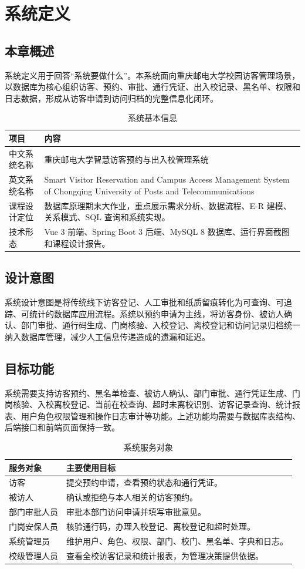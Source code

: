 \section{系统定义}
\subsection{本章概述}
系统定义用于回答“系统要做什么”。本系统面向重庆邮电大学校园访客管理场景，以数据库为核心组织访客、预约、审批、通行凭证、出入校记录、黑名单、权限和日志数据，形成从访客申请到访问归档的完整信息化闭环。
\begin{longtable}{>{\raggedright\arraybackslash}p{}>{\raggedright\arraybackslash}p{}}
\caption{系统基本信息}\\
\toprule
项目 & 内容 \\
\midrule
中文系统名称 & 重庆邮电大学智慧访客预约与出入校管理系统 \\
英文系统名称 & Smart Visitor Reservation and Campus Access Management System of Chongqing University of Posts and Telecommunications \\
课程设计定位 & 数据库原理期末大作业，重点展示需求分析、数据流程、E-R 建模、关系模式、SQL 查询和系统实现。 \\
技术形态 & Vue 3 前端、Spring Boot 3 后端、MySQL 8 数据库、运行界面截图和课程设计报告。 \\
\bottomrule
\end{longtable}
\subsection{设计意图}
系统设计意图是将传统线下访客登记、人工审批和纸质留痕转化为可查询、可追踪、可统计的数据库应用流程。系统以预约申请为主线，将访客身份、被访人确认、部门审批、通行码生成、门岗核验、入校登记、离校登记和访问记录归档统一纳入数据库管理，减少人工信息传递造成的遗漏和延迟。

\subsection{目标功能}
系统需要支持访客预约、黑名单检查、被访人确认、部门审批、通行凭证生成、门岗核验、入校离校登记、当前在校查询、超时未离校识别、访客记录查询、统计报表、用户角色权限管理和操作日志审计等功能。上述功能均需要与数据库表结构、后端接口和前端页面保持一致。
\begin{longtable}{>{\raggedright\arraybackslash}p{}>{\raggedright\arraybackslash}p{}}
\caption{系统服务对象}\\
\toprule
服务对象 & 主要使用目标 \\
\midrule
访客 & 提交预约申请，查看预约状态和通行凭证。 \\
被访人 & 确认或拒绝与本人相关的访客预约。 \\
部门审批人员 & 审批本部门访问申请并填写审批意见。 \\
门岗安保人员 & 核验通行码，办理入校登记、离校登记和超时处理。 \\
系统管理员 & 维护用户、角色、权限、部门、校门、黑名单、字典和日志。 \\
校级管理人员 & 查看全校访客记录和统计报表，为管理决策提供依据。 \\
\bottomrule
\end{longtable}
